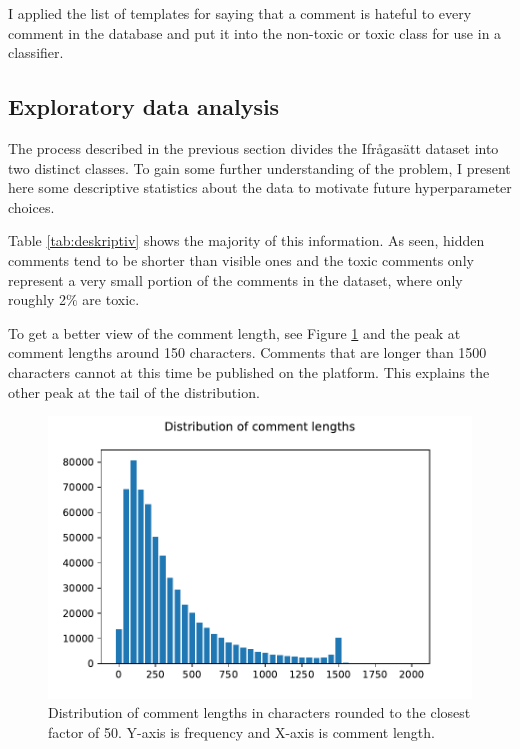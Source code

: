 \documentclass[nofilelist]{cslthse-msc}
\begin{document}
I applied the list of templates for saying that a comment is hateful to every comment in the database and put it into the non-toxic or toxic class for use in a classifier.

\subsection{Exploratory data analysis}

The process described in the previous section divides the Ifrågasätt dataset into two distinct classes. To gain some further understanding of the problem, I present here some descriptive statistics about the data to motivate future hyperparameter choices.


Table \ref{tab:deskriptiv} shows the majority of this information. As seen, hidden comments tend to be shorter than visible ones and the toxic comments only represent a very small portion of the comments in the dataset, where only roughly 2$\%$ are toxic. 

To get a better view of the comment length, see Figure \ref{fig:distribution} and the peak at comment lengths around 150 characters. Comments that are longer than 1500 characters cannot at this time be published on the platform. This explains the other peak at the tail of the distribution.

\begin{figure}[t]
    \centering
    \includegraphics{langddistribution.pdf}
    \caption{Distribution of comment lengths in characters rounded to the closest factor of 50. Y-axis is frequency and X-axis is comment length.}
    \label{fig:distribution}
\end{figure}
\end{document}
